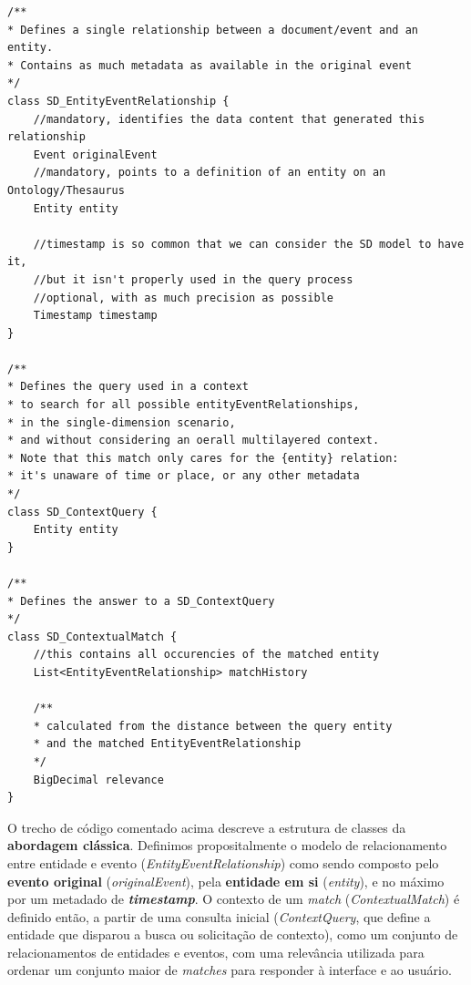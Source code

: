 \begin{verbatim}
/**
* Defines a single relationship between a document/event and an entity.
* Contains as much metadata as available in the original event
*/
class SD_EntityEventRelationship {
    //mandatory, identifies the data content that generated this relationship
    Event originalEvent
    //mandatory, points to a definition of an entity on an Ontology/Thesaurus
    Entity entity

    //timestamp is so common that we can consider the SD model to have it,
    //but it isn't properly used in the query process
    //optional, with as much precision as possible
    Timestamp timestamp
}

/**
* Defines the query used in a context
* to search for all possible entityEventRelationships,
* in the single-dimension scenario,
* and without considering an oerall multilayered context.
* Note that this match only cares for the {entity} relation:
* it's unaware of time or place, or any other metadata
*/
class SD_ContextQuery {
    Entity entity
}

/**
* Defines the answer to a SD_ContextQuery
*/
class SD_ContextualMatch {
    //this contains all occurencies of the matched entity
    List<EntityEventRelationship> matchHistory

    /**
    * calculated from the distance between the query entity
    * and the matched EntityEventRelationship
    */
    BigDecimal relevance
}
\end{verbatim}

O trecho de código comentado acima descreve a estrutura de classes da \textbf{abordagem clássica}. Definimos propositalmente o modelo de relacionamento entre entidade e evento (\textit{EntityEventRelationship}) como sendo composto pelo \textbf{evento original} (\textit{originalEvent}), pela \textbf{entidade em si} (\textit{entity}), e no máximo por um metadado de \textbf{\textit{timestamp}}. O contexto de um \textit{match} (\textit{ContextualMatch}) é definido então, a partir de uma consulta inicial (\textit{ContextQuery}, que define a entidade que disparou a busca ou solicitação de contexto), como um conjunto de relacionamentos de entidades e eventos, com uma relevância utilizada para ordenar um conjunto maior de \textit{matches} para responder à interface e ao usuário.

\newpage


